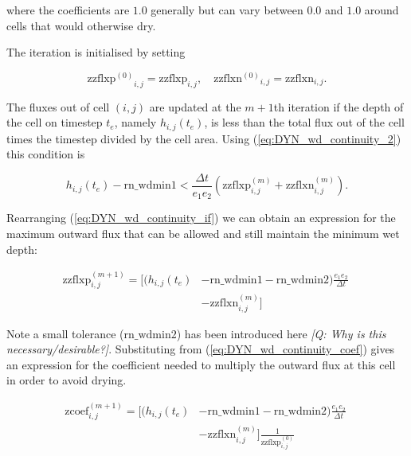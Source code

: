 \documentclass[../main/NEMO_manual]{subfiles}
\begin{document}
where the coefficients are $1.0$ generally but can vary between $0.0$ and $1.0$ around
cells that would otherwise dry.

The iteration is initialised by setting

\begin{equation}
  \label{eq:DYN_wd_zzflx_initial}
  \mathrm{zzflxp^{(0)}}_{i,j} = \mathrm{zzflxp}_{i,j} , \quad  \mathrm{zzflxn^{(0)}}_{i,j} = \mathrm{zzflxn}_{i,j} .
\end{equation}

The fluxes out of cell $(i,j)$ are updated at the $m+1$th iteration if the depth of the
cell on timestep $t_e$, namely $h_{i,j}(t_e)$, is less than the total flux out of the cell
times the timestep divided by the cell area. Using (\autoref{eq:DYN_wd_continuity_2}) this
condition is

\begin{equation}
  \label{eq:DYN_wd_continuity_if}
  h_{i,j}(t_e)  - \mathrm{rn\_wdmin1} <  \frac{\Delta t}{e_1 e_2} ( \mathrm{zzflxp}^{(m)}_{i,j} + \mathrm{zzflxn}^{(m)}_{i,j} ) .
\end{equation}

Rearranging (\autoref{eq:DYN_wd_continuity_if}) we can obtain an expression for the maximum
outward flux that can be allowed and still maintain the minimum wet depth:

\begin{equation}
  \label{eq:DYN_wd_max_flux}
  \begin{split}
    \mathrm{zzflxp}^{(m+1)}_{i,j} = \Big[ (h_{i,j}(t_e) & - \mathrm{rn\_wdmin1} - \mathrm{rn\_wdmin2})  \frac{e_1 e_2}{\Delta t} \phantom{]} \\
    \phantom{[} & -  \mathrm{zzflxn}^{(m)}_{i,j} \Big]
  \end{split}
\end{equation}

Note a small tolerance ($\mathrm{rn\_wdmin2}$) has been introduced here {\itshape [Q: Why is
this necessary/desirable?]}. Substituting from (\autoref{eq:DYN_wd_continuity_coef}) gives an
expression for the coefficient needed to multiply the outward flux at this cell in order
to avoid drying.

\begin{equation}
  \label{eq:DYN_wd_continuity_nxtcoef}
  \begin{split}
    \mathrm{zcoef}^{(m+1)}_{i,j} = \Big[ (h_{i,j}(t_e) & - \mathrm{rn\_wdmin1} - \mathrm{rn\_wdmin2})  \frac{e_1 e_2}{\Delta t} \phantom{]} \\
    \phantom{[} & -  \mathrm{zzflxn}^{(m)}_{i,j} \Big] \frac{1}{ \mathrm{zzflxp}^{(0)}_{i,j} }
  \end{split}
\end{equation}
\end{document}

